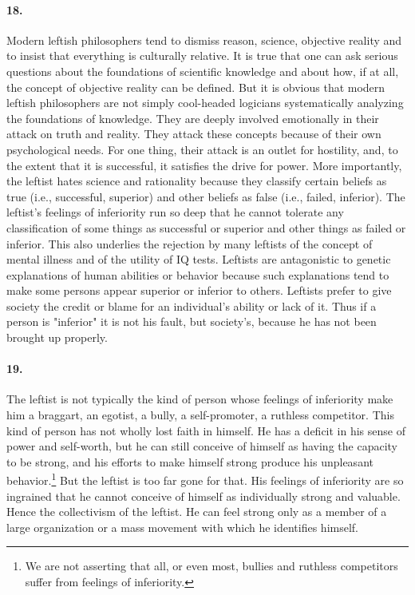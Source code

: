 \documentclass[12pt]{book}
\begin{document}
\paragraph{18.} Modern leftish philosophers tend to dismiss reason, science, objective reality and to insist that everything is culturally relative. It is true that one can ask serious questions about the foundations of scientific knowledge and about how, if at all, the concept of objective reality can be defined. But it is obvious that modern leftish philosophers are not simply cool-headed logicians systematically analyzing the foundations of knowledge. They are deeply involved emotionally in their attack on truth and reality. They attack these concepts because of their own psychological needs. For one thing, their attack is an outlet for hostility, and, to the extent that it is successful, it satisfies the drive for power. More importantly, the leftist hates science and rationality because they classify certain beliefs as true (i.e., successful, superior) and other beliefs as false (i.e., failed, inferior). The leftist's feelings of inferiority run so deep that he cannot tolerate any classification of some things as successful or superior and other things as failed or inferior. This also underlies the rejection by many leftists of the concept of mental illness and of the utility of IQ tests. Leftists are antagonistic to genetic explanations of human abilities or behavior because such explanations tend to make some persons appear superior or inferior to others. Leftists prefer to give society the credit or blame for an individual's ability or lack of it. Thus if a person is "inferior" it is not his fault, but society's, because he has not been brought up properly.


\paragraph{19.} The leftist is not typically the kind of person whose feelings of inferiority make him a braggart, an egotist, a bully, a self-promoter, a ruthless competitor. This kind of person has not wholly lost faith in himself. He has a deficit in his sense of power and self-worth, but he can still conceive of himself as having the capacity to be strong, and his efforts to make himself strong produce his unpleasant behavior.\footnote{We are not asserting that all, or even most, bullies and ruthless competitors suffer from feelings of inferiority.} But the leftist is too far gone for that. His feelings of inferiority are so ingrained that he cannot conceive of himself as individually strong and valuable. Hence the collectivism of the leftist. He can feel strong only as a member of a large organization or a mass movement with which he identifies himself.
\end{document}
